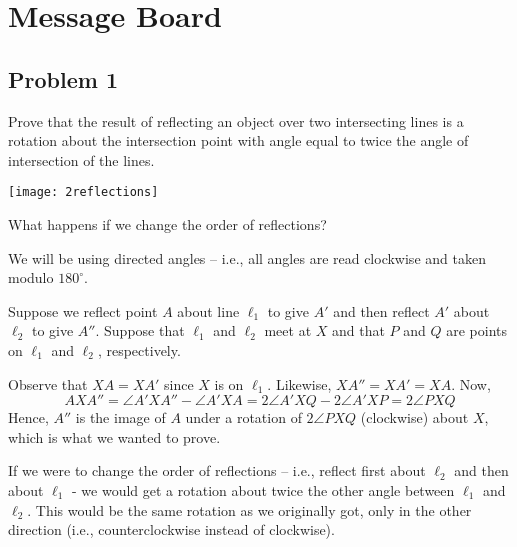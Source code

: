 \section{Message Board}

\subsection{Problem 1}

Prove that the result of reflecting an object over two intersecting lines is a rotation about the intersection point with angle equal to twice the angle of intersection of the lines.

\begin{center}
\texttt{[image: 2reflections]}
\end{center}
What happens if we change the order of reflections?

\begin{mdsoln}
We will be using directed angles – i.e., all angles are read clockwise and taken modulo $ 180^\circ$.

Suppose we reflect point $ A$ about line $ \ell_1$ to give $ A'$ and then reflect $ A'$ about $ \ell_2$ to give $ A''$. Suppose that $ \ell_1$ and $ \ell_2$ meet at $ X$ and that $ P$ and $ Q$ are points on $ \ell_1$ and $ \ell_2$, respectively.

Observe that $ XA=XA'$ since $ X$ is on $ \ell_1$. Likewise, $ XA''=XA'=XA$. Now,\[ AXA''=\angle A'XA''-\angle A'XA=2\angle A'XQ-2\angle A'XP=2\angle PXQ\]Hence, $ A''$ is the image of $ A$ under a rotation of $ 2\angle PXQ$ (clockwise) about $ X$, which is what we wanted to prove.

If we were to change the order of reflections – i.e., reflect first about $ \ell_2$ and then about $ \ell_1$ - we would get a rotation about twice the other angle between $ \ell_1$ and $ \ell_2$. This would be the same rotation as we originally got, only in the other direction (i.e., counterclockwise instead of clockwise).    
\end{mdsoln}

